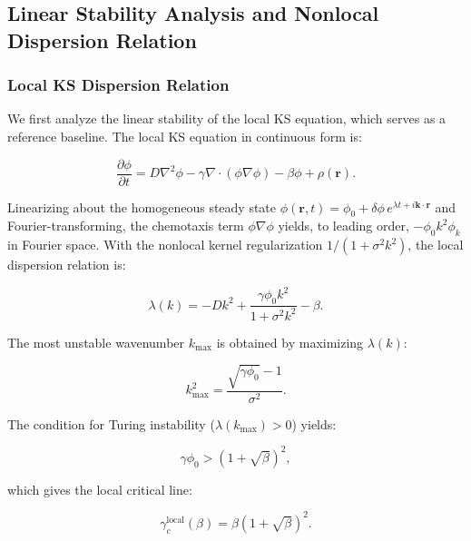 \documentclass[sn-nature,pdflatex]{sn-jnl}
\begin{document}
\subsection{Linear Stability Analysis and Nonlocal Dispersion Relation}
\label{sec:linear_stability}

\subsubsection{Local KS Dispersion Relation}

We first analyze the linear stability of the local KS equation, which serves as a reference baseline.
The local KS equation in continuous form is:

\begin{equation}
\frac{\partial \phi}{\partial t} = D \nabla^2 \phi - \gamma \nabla \cdot (\phi \nabla \phi) - \beta \phi + \rho(\mathbf{r}).
\end{equation}

Linearizing about the homogeneous steady state $\phi(\mathbf{r},t) = \phi_0 + \delta\phi \, e^{\lambda t + i\mathbf{k}\cdot\mathbf{r}}$ and Fourier-transforming, the chemotaxis term $\phi \nabla \phi$ yields, to leading order, $-\phi_0 k^2 \phi_k$ in Fourier space.
With the nonlocal kernel regularization $1/(1 + \sigma^2 k^2)$, the local dispersion relation is:

\begin{equation}
\label{eq:local_dispersion}
\lambda(k) = -D k^2 + \frac{\gamma \phi_0 k^2}{1 + \sigma^2 k^2} - \beta.
\end{equation}

The most unstable wavenumber $k_{\max}$ is obtained by maximizing $\lambda(k)$:

\begin{equation}
k_{\max}^2 = \frac{\sqrt{\gamma \phi_0} - 1}{\sigma^2}.
\end{equation}

The condition for Turing instability ($\lambda(k_{\max}) > 0$) yields:

\begin{equation}
\label{eq:turing_condition}
\gamma \phi_0 > (1 + \sqrt{\beta})^2,
\end{equation}

which gives the local critical line:

\begin{equation}
\label{eq:local_gamma_c}
\gamma_c^{\text{local}}(\beta) = \beta (1 + \sqrt{\beta})^2.
\end{equation}
\end{document}
